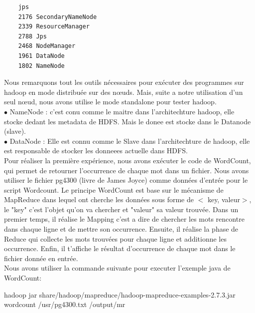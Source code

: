 \documentclass[11pt]{article}
\begin{document}
\begin{center}
	\begin{lstlisting}
    jps
    2176 SecondaryNameNode
    2339 ResourceManager
    2788 Jps
    2468 NodeManager
    1961 DataNode
    1802 NameNode
	\end{lstlisting}
\end{center}
Nous remarquons tout les outils nécessaires pour exécuter des programmes sur hadoop en mode distribuée sur des nœuds. Mais, suite a notre utilisation d'un seul nœud, nous avons utilise le mode standalone pour tester hadoop.
\\

$\bullet$ NameNode : c'est conu comme le maitre dans l'architechture hadoop, elle stocke dedant les metadata de HDFS. Mais le donee est stocke dans le Datanode (slave).
\\

$\bullet$ DataNode : Elle est connu comme le Slave dans l'architechture de hadoop, elle est responsable de stocker les donneees actuelle dans HDFS.
\\

Pour réaliser la première expérience, nous avons exécuter le code de WordCount, qui permet de retourner l'occurrence de chaque mot dans un fichier.
Nous avons utiliser le fichier pg4300 (livre de James Joyce) \cite{wwwguten70} comme données d'entrée pour le script Wordcount. Le principe WordCount est base sur le mécanisme de MapReduce dans lequel ont cherche les données sous forme de $<$ key, valeur$ >$, le "key" c'est l'objet qu'on va chercher et "valeur" sa valeur trouvée. Dans un premier temps, il réalise le Mapping c'est a dire de chercher les mots rencontre dans chaque ligne et de mettre son occurrence. Ensuite, il réalise la phase de Reduce qui collecte les mots trouvées pour chaque ligne et additionne les occurrence. Enfin, il t'affiche le résultat d'occurrence de chaque mot dans le fichier donnée en entrée.
\\
Nous avons utiliser la commande suivante pour executer l'exemple java de WordCount:
\\

\begin{scriptsize} 
hadoop jar share/hadoop/mapreduce/hadoop-mapreduce-examples-2.7.3.jar wordcount /usr/pg4300.txt /output/mr
\end{scriptsize}
\\
\end{document}

